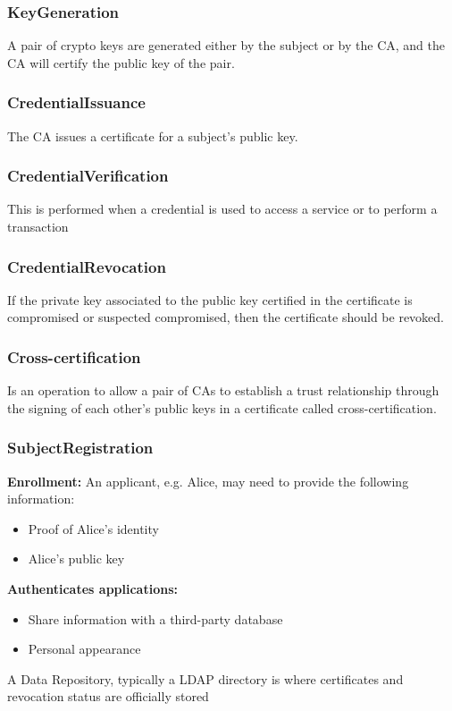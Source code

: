 \documentclass{article}
\begin{document}
\subsubsection{KeyGeneration}
A pair of crypto keys are generated either by the subject or by the CA, and the CA will certify the public key of the pair.
\subsubsection{CredentialIssuance}
The CA issues a certificate for a subject's public key.
\subsubsection{CredentialVerification}
This is performed when a credential is used to access a service or to perform a transaction
\subsubsection{CredentialRevocation}
If the private key associated to the public key certified in the certificate is compromised or suspected compromised, then the certificate should be revoked.
\subsubsection{Cross-certification}
Is an operation to allow a pair of CAs to establish a trust relationship through the signing of each other's public keys in a certificate called cross-certification.
\subsubsection{SubjectRegistration}
\textbf{Enrollment:} An applicant, e.g. Alice, may need to provide the following information:
\begin{itemize}
  \item Proof of Alice's identity
  \item Alice's public key
\end{itemize}
\textbf{Authenticates applications:}
\begin{itemize}
  \item Share information with a third-party database
  \item Personal appearance
\end{itemize}
A Data Repository, typically a LDAP directory is where certificates and revocation status are officially stored
\end{document}
